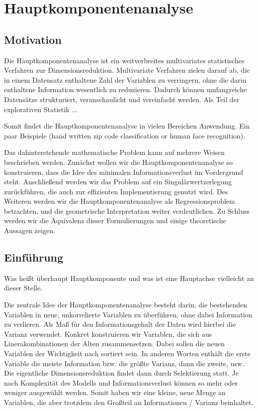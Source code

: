 \chapter{Hauptkomponentenanalyse}

\label{pca}

\section{Motivation}

Die Hauptkomponentenanalyse ist ein weitverbreites multivariates statistisches Verfahren zur Dimensionsreduktion. Multivariate Verfahren zielen darauf ab, die in einem Datensatz enthaltene Zahl der Variablen zu verringern, ohne die darin enthaltene Information wesentlich zu reduzieren. Dadurch können umfangreiche Datensätze strukturiert, veranschaulicht und vereinfacht werden. Als Teil der explorativen Statistik ...

Somit findet die Hauptkomponentenanalyse in vielen Bereichen Anwendung.
Ein paar Beispiele (hand written zip code classification or human face recognition).

Das dahinterstehende mathematische Problem kann auf mehrere Weisen beschrieben werden. Zunächst wollen wir die Hauptkomponentenanalyse so konstruieren, dass die Idee des minimalen Informationsverlust im Vordergrund steht. Anschließend werden wir das Problem auf ein Singulärwertzerlegung zurückführen, die auch zur effizienten Implementierung genutzt wird. Des Weiteren werden wir die Hauptkomponentenanalyse als Regressionsproblem betrachten, und die geometrische Interpretation weiter verdeutlichen. Zu Schluss werden wir die Äquivalenz dieser Formulierungen und einige theoretische Aussagen zeigen.

\section{Einführung}

Was heißt überhaupt Hauptkomponente und was ist eine Hauptachse vielleicht an dieser Stelle.

Die zentrale Idee der Hauptkomponentenanalyse besteht darin, die bestehenden Variablen in neue, unkorrelierte Variablen zu überführen, ohne dabei Information zu verlieren. Als Maß für den Informationsgehalt der Daten wird hierbei die Varianz verwendet. Konkret konstruieren wir Variablen, die sich aus Linerakombinationen der Alten zusammensetzen. Dabei sollen die neuen Variablen der Wichtigkeit nach sortiert sein. In anderen Worten enthält die erste Variable die meiste Information bzw. die größte Varianz, dann die zweite, usw.
Die eigentliche Dimensionsreduktion findet dann durch Selektierung statt. Je nach Komplexität des Modells und Informationsverlust können so mehr oder weniger ausgewählt werden. Somit haben wir eine kleine, neue Menge an Variablen, die aber trotzdem den Großteil an Informationen / Varianz beinhaltet.




